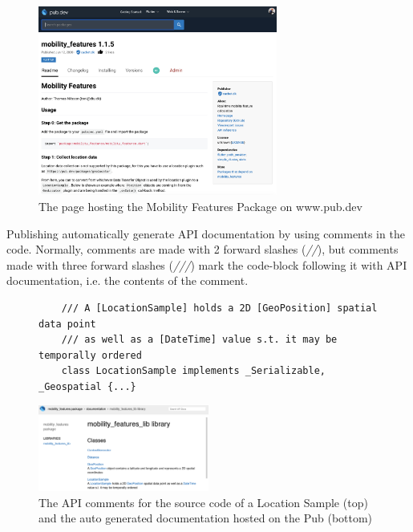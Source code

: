 \begin{figure}
    \centering
    \includegraphics[width=0.7\textwidth]{images/pub.png}
    \caption{The page hosting the Mobility Features Package on www.pub.dev}
    \label{fig:pub-package}
\end{figure}

Publishing automatically generate API documentation by using comments in the code. Normally, comments are made with 2 forward slashes (\textit{//}), but comments made with three forward slashes (\textit{///}) mark the code-block following it with API documentation, i.e. the contents of the comment. 

\begin{figure}
    \centering
    \begin{verbatim}
    /// A [LocationSample] holds a 2D [GeoPosition] spatial data point
    /// as well as a [DateTime] value s.t. it may be temporally ordered
    class LocationSample implements _Serializable, _Geospatial {...}
    \end{verbatim}
    \includegraphics[width=0.5\textwidth]{images/docs.png}
    \caption{The API comments for the source code of a Location Sample (top) and the auto generated documentation hosted on the Pub (bottom)}
    \label{fig:api-docs}
\end{figure}

